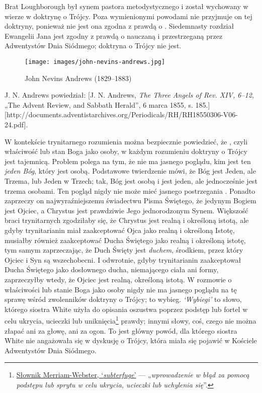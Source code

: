 Brat Loughborough był synem pastora metodystycznego i został wychowany w wierze w doktrynę o Trójcy. Poza wymienionymi powodami nie przyjmuje on tej doktryny, ponieważ nie jest ona zgodna z prawdą o . Siedemnasty rozdział Ewangelii Jana jest zgodny z prawdą o  nauczaną i przestrzeganą przez Adwentystów Dnia Siódmego; doktryna o Trójcy nie jest.

\begin{figure}[hp]
    \centering
    \texttt{[image: images/john-nevins-andrews.jpg]}
    \caption*{John Nevins Andrews (1829--1883)}
    \label{fig:j-n-andrews}
\end{figure}

J. N. Andrews powiedział: [J. N. Andrews, \textit{The Three Angels of Rev. XIV, 6--12}, „The Advent Review, and Sabbath Herald”, 6 marca 1855, s. 185.][http://documents.adventistarchives.org/Periodicals/RH/RH18550306-V06-24.pdf].

W kontekście trynitarnego rozumienia  można bezpiecznie powiedzieć, że , czyli właściwość lub stan Boga jako osoby, w każdym rozumieniu doktryny o Trójcy jest tajemnicą. Problem polega na tym, że nie ma jasnego poglądu, kim jest ten \textit{jeden Bóg}, który jest osobą. Podstawowe twierdzenie mówi, że Bóg jest Jeden, ale Trzema, lub Jeden w Trzech; tak, Bóg jest osobą i jest jeden, ale jednocześnie jest trzema osobami. Ten pogląd nigdy nie może mieć jasnego postrzegania . Ponadto zaprzeczy on najwyraźniejszemu świadectwu Pisma Świętego, że jedynym Bogiem jest Ojciec, a Chrystus jest prawdziwie Jego jednorodzonym Synem. Większość braci trynitarnych zgodziłaby się, że Chrystus jest realną i określoną istotą, ale gdyby trynitarianin miał zaakceptować Ojca jako realną i określoną Istotę, musiałby również zaakceptować Ducha Świętego jako realną i określoną istotę, tym samym zaprzeczając, że Duch Święty jest \textit{duchem}, środkiem, przez który Ojciec i Syn są wszechobecni. I odwrotnie, gdyby trynitarianin zaakceptował Ducha Świętego jako dosłownego ducha, niemającego ciała ani formy, zaprzeczyłby wtedy, że Ojciec jest realną, określoną istotą. W rozmowie o właściwości lub stanie Boga jako osoby nigdy nie ma jasnego poglądu na tę sprawę wśród zwolenników doktryny o Trójcy; to wybieg. \textit{‘Wybiegi’} to słowo, którego siostra White użyła do opisania oszustwa poprzez podstęp lub fortel w celu ukrycia, ucieczki lub uniknięcia\footnote{\href{https://www.merriam-webster.com/dictionary/subterfuges}{Słownik Merriam-Webster, ‘\textit{subterfuge}’} — „\textit{wprowadzenie w błąd za pomocą podstępu lub sprytu w celu ukrycia, ucieczki lub uchylenia się}”.} prawdy; innymi słowy, coś, czego nie można złapać ani za głowę, ani za ogon. To jest główny powód, dla którego siostra White nie angażowała się w dyskusję o Trójcy, która miała się pojawić w Kościele Adwentystów Dnia Siódmego.

